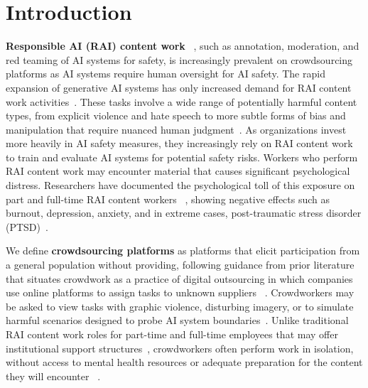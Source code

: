 \section{Introduction}


\textbf{Responsible AI (RAI) content work} ~\cite{qian2025aura}, such as annotation, moderation, and red teaming of AI systems for safety, is increasingly prevalent on crowdsourcing platforms as AI systems require human oversight for AI safety. The rapid expansion of generative AI systems has only increased demand for RAI content work activities~\cite{StanfordHAI2025AIIndex, GrandViewResearch2024GenerativeAI}. These tasks involve a wide range of potentially harmful content types, from explicit violence and hate speech to more subtle forms of bias and manipulation that require nuanced human judgment~\cite{qian2025aura}. As organizations invest more heavily in AI safety measures, they increasingly rely on RAI content work to train and evaluate AI systems for potential safety risks. Workers who perform RAI content work may encounter material that causes significant psychological distress. Researchers have documented the psychological toll of this exposure on part and full-time RAI content workers ~\cite {roberts2016commercial, qian2025aura}, showing negative effects such as burnout, depression, anxiety, and in extreme cases, post-traumatic stress disorder (PTSD)~\cite{alemadi2024emotional,martinez2024secondary, spence2025content, gebrekidan2024content}. 

We define \textbf{crowdsourcing platforms} as platforms that elicit participation from a general population without providing, following guidance from prior literature that situates crowdwork as a practice of digital outsourcing in which companies use online platforms to assign tasks to unknown suppliers ~\cite{irani2016stories}. 
Crowdworkers may be asked to view tasks with graphic violence, disturbing imagery, or to simulate harmful scenarios designed to probe AI system boundaries~\cite{qian2025locating}. 
Unlike traditional RAI content work roles for part-time and full-time employees that may offer institutional support structures~\cite{qian2025aura, roberts2016commercial, steiger_psychological_2021}, crowdworkers often perform work in isolation, without access to mental health resources or adequate preparation for the content they will encounter ~\cite{schlicher2021flexible, berastegui2021exposure}. 

